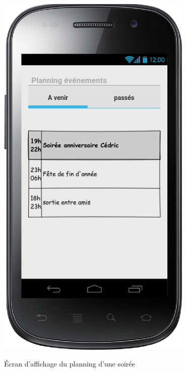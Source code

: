 \documentclass[a4paper, 12pt, notitlepage]{article} %
\begin{document}
\begin{maquetteFig}[!htb]
   \centering
     \includegraphics[width=0.7\textwidth]{planning.png}
     \caption{Écran d'affichage du planning d'une soirée}
     \label{Maquette:Planning}
\end{maquetteFig}
\end{document}
